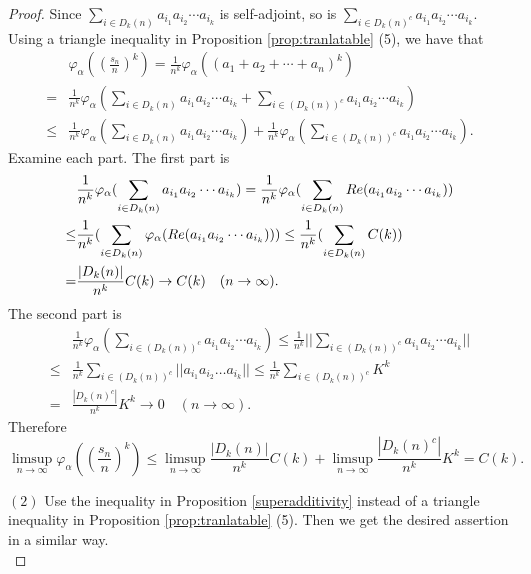 \documentclass[10pt,a4paper]{amsart}
\begin{document}
\begin{proof}
Since $\sum_{i \in D_k(n)} a_{i_1}a_{i_2}\cdots a_{i_k}$ is self-adjoint, so is
$\sum_{i \in D_k(n)^c} a_{i_1}a_{i_2}\cdots a_{i_k}$.
Using a triangle inequality in Proposition \ref{prop:tranlatable} (5), we have that
\begin{align*}
     & \varphi_{\alpha}((\frac{s_n}{n})^k) = \frac{1}{n^k}  \varphi_{\alpha}((a_1 + a_2 + \cdots + a_n)^k)  \\
  = & \frac{1}{n^k}  \varphi_{\alpha}( \sum_{i \in D_k(n)} a_{i_1}a_{i_2} \cdots a_{i_k} 
         +  \sum_{i \in (D_k(n))^c} a_{i_1}a_{i_2} \cdots a_{i_k} )  \\
  \leq &  \frac{1}{n^k}  \varphi_{\alpha}( \sum_{i \in D_k(n)} a_{i_1}a_{i_2} \cdots a_{i_k} )
         +  \frac{1}{n^k} \varphi_{\alpha} (\sum_{i \in (D_k(n))^c} a_{i_1}a_{i_2} \cdots a_{i_k} ).
\end{align*}
Examine each part.  The first part is 
\begin{align*}
& \frac{1}{n^k}  \varphi_{\alpha}( \sum_{i \in D_k(n)} a_{i_1}a_{i_2} \cdots a_{i_k} ) 
= \frac{1}{n^k}  \varphi_{\alpha}( \sum_{i \in D_k(n)} {\rm Re} (a_{i_1}a_{i_2} \cdots a_{i_k}) ) \\
\leq &  \frac{1}{n^k}  ( \sum_{i \in D_k(n)} \varphi_{\alpha}({\rm Re}(a_{i_1}a_{i_2} \cdots a_{i_k}) ))
  \leq  \frac{1}{n^k}  ( \sum_{i \in D_k(n)} C(k) ) \\
= & \frac{|D_k(n)|}{n^k} C(k) \to C(k) \quad (n\to \infty).
\end{align*}
The second part is 
\begin{align*} 
  &  \frac{1}{n^k} \varphi_{\alpha} (\sum_{i \in (D_k(n))^c} a_{i_1}a_{i_2} \cdots a_{i_k} ) 
      \leq \frac{1}{n^k}  ||\sum_{i \in (D_k(n))^c} a_{i_1}a_{i_2} \cdots a_{i_k} || \\
 \leq & \frac{1}{n^k}  \sum_{i \in (D_k(n))^c} ||a_{i_1}a_{i_2} \dots a_{i_k} || 
      \leq  \frac{1}{n^k}  \sum_{i \in (D_k(n))^c} K^k \\
   = &  \frac{|D_k(n)^c|}{n^k} K^k \to 0 \quad (n \to \infty).
\end{align*} 
Therefore 
\[   \limsup _{n \to \infty}  \varphi_{\alpha}((\frac{s_n}{n})^k) 
     \leq \limsup _{n \to \infty} \frac{|D_k(n)|}{n^k}C(k)    
           + \limsup _{n \to \infty} \frac{|D_k(n)^c|}{n^k}K^k = C(k).  
\]

$(2)$  Use the inequality in Proposition \ref{superadditivity} instead of a triangle inequality in Proposition \ref{prop:tranlatable} (5). Then we get the desired assertion in a similar way.  \\
\end{proof}
\end{document}
